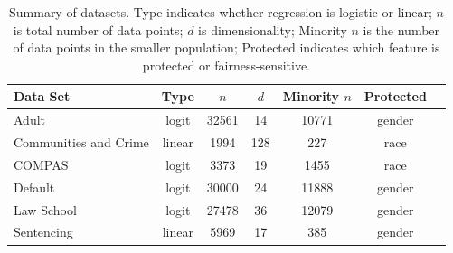 \begin{table}[h]
\begin{center}
\begin{tabular}{|l|c|c|c|c|c|c|}
\hline
{\bf Data Set\/} & {\bf Type\/}  & {\bf $n$\/} & {\bf $d$\/} & {\bf Minority $n$\/} & {\bf Protected\/}
   \\ \hline
Adult & logit & 32561 & 14 & 10771 & gender
     \\\hline
Communities and Crime & linear & 1994 & 128 & 227 & race
     \\\hline
COMPAS & logit & 3373 & 19 & 1455 & race
     \\\hline
Default & logit & 30000 & 24 & 11888 & gender
     \\\hline
Law School & logit & 27478 & 36 & 12079 & gender
     \\\hline
Sentencing & linear & 5969 & 17  & 385 & gender
     \\\hline
\end{tabular}
\end{center}
\caption{Summary of datasets. 
Type indicates whether regression is logistic or linear;
$n$ is total number of data points;
$d$ is dimensionality;
Minority $n$ is the number of data points in the smaller population;
Protected indicates which feature is protected or fairness-sensitive.
}
\label{tab:summary}
\end{table}
